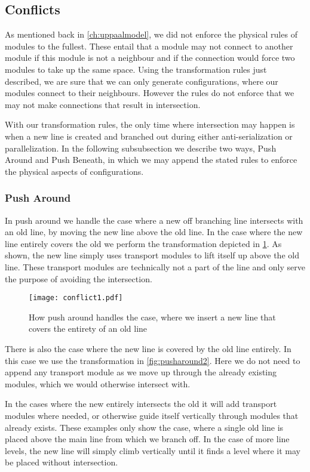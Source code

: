 \subsection{Conflicts}\label{ssec:conflicts}
As mentioned back in \cref{ch:uppaalmodel}, we did not enforce the physical rules of modules to the fullest. These entail that a module may not connect to another module if this module is not a neighbour and if the connection would force two modules to take up the same space. Using the transformation rules just described, we are sure that we can only generate configurations, where our modules connect to their neighbours. However the rules do not enforce that we may not make connections that result in intersection. 

With our transformation rules, the only time where intersection may happen is when a new line is created and branched out during either anti-serialization or parallelization. In the following subsubsection we describe two ways, Push Around and Push Beneath, in which we may append the stated rules to enforce the physical aspects of configurations.

\subsubsection{Push Around}
In push around we handle the case where a new off branching line intersects with an old line, by moving the new line above the old line. In the case where the new line entirely covers the old we perform the transformation depicted in \cref{fig:pusharound1}. As shown, the new line simply uses transport modules to lift itself up above the old line. These transport modules are technically not a part of the line and only serve the purpose of avoiding the intersection.

\begin{figure}[h]
\centering
\texttt{[image: conflict1.pdf]}
\caption{How push around handles the case, where we insert a new line that covers the entirety of an old line}
\label{fig:pusharound1}
\end{figure}

There is also the case where the new line is covered by the old line entirely. In this case we use the transformation in \cref{fig:pusharound2}. Here we do not need to append any transport module as we move up through the already existing modules, which we would otherwise intersect with. 

In the cases where the new entirely intersects the old it will add transport modules where needed, or otherwise guide itself vertically through modules that already exists. These examples only show the case, where a single old line is placed above the main line from which we branch off. In the case of more line levels, the new line will simply climb vertically until it finds a level where it may be placed without intersection. 

